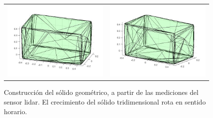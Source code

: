 \begin{figure}[ht!]
\begin{tabular}{cc}
        \includegraphics[width=.50\textwidth]{images/5.jpg}&
        \includegraphics[width=.50\textwidth]{images/6.jpg}\\
    \end{tabular}
  \captionsetup{font=footnotesize}
    \caption{\label{fig:Caja3D}Construcción del sólido geométrico, a partir de 
    las mediciones del sensor lidar. El crecimiento del sólido tridimensional 
    rota en sentido horario.}
\end{figure}


